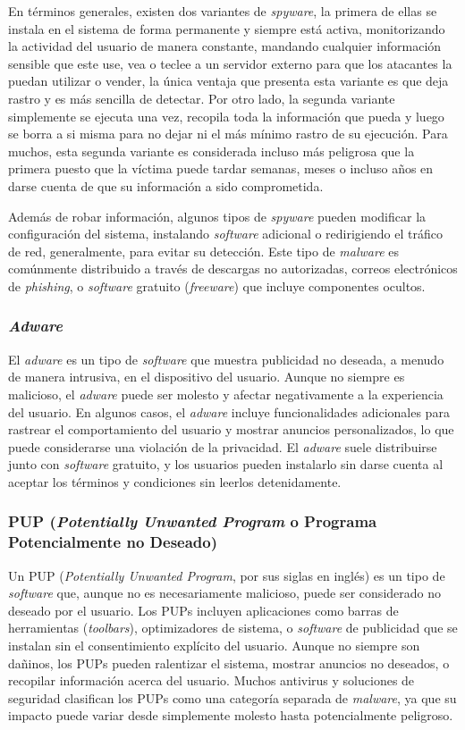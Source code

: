 En términos generales, existen dos variantes de \textit{spyware}, la primera de ellas se instala en el sistema de forma permanente y siempre está activa, monitorizando la actividad del usuario de manera constante, mandando cualquier información sensible que este use, vea o teclee a un servidor externo para que los atacantes la puedan utilizar o vender, la única ventaja que presenta esta variante es que deja rastro y es más sencilla de detectar. Por otro lado, la segunda variante simplemente se ejecuta una vez, recopila toda la información que pueda y luego se borra a si misma para no dejar ni el más mínimo rastro de su ejecución. Para muchos, esta segunda variante es considerada incluso más peligrosa que la primera puesto que la víctima puede tardar semanas, meses o incluso años en darse cuenta de que su información a sido comprometida. 

Además de robar información, algunos tipos de \textit{spyware} pueden modificar la configuración del sistema, instalando \textit{software} adicional o redirigiendo el tráfico de red, generalmente, para evitar su detección. Este tipo de \textit{malware} es comúnmente distribuido a través de descargas no autorizadas, correos electrónicos de \textit{phishing}, o \textit{software} gratuito (\textit{freeware}) que incluye componentes ocultos.

\subsubsection{\textit{Adware}}
El \textit{adware} es un tipo de \textit{software} que muestra publicidad no deseada, a menudo de manera intrusiva, en el dispositivo del usuario. Aunque no siempre es malicioso, el \textit{adware} puede ser molesto y afectar negativamente a la experiencia del usuario. En algunos casos, el \textit{adware} incluye funcionalidades adicionales para rastrear el comportamiento del usuario y mostrar anuncios personalizados, lo que puede considerarse una violación de la privacidad. El \textit{adware} suele distribuirse junto con \textit{software} gratuito, y los usuarios pueden instalarlo sin darse cuenta al aceptar los términos y condiciones sin leerlos detenidamente.

\subsubsection{PUP (\textit{Potentially Unwanted Program} o Programa Potencialmente no Deseado)}
Un PUP (\textit{Potentially Unwanted Program}, por sus siglas en inglés) es un tipo de \textit{software} que, aunque no es necesariamente malicioso, puede ser considerado no deseado por el usuario. Los PUPs incluyen aplicaciones como barras de herramientas (\textit{toolbars}), optimizadores de sistema, o \textit{software} de publicidad que se instalan sin el consentimiento explícito del usuario. Aunque no siempre son dañinos, los PUPs pueden ralentizar el sistema, mostrar anuncios no deseados, o recopilar información acerca del usuario. Muchos antivirus y soluciones de seguridad clasifican los PUPs como una categoría separada de \textit{malware}, ya que su impacto puede variar desde simplemente molesto hasta potencialmente peligroso.

